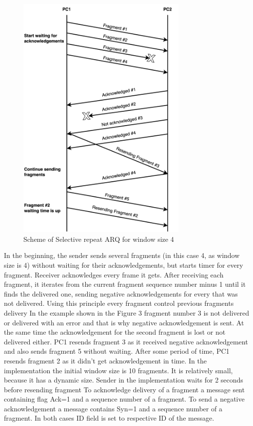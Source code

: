 \documentclass{article}
\begin{document}
\begin{figure}[!h]
    \centering
    \includegraphics[width=0.75\textwidth]{images/arq.png}
    \caption{Scheme of Selective repeat ARQ for window size 4}
    \label{fig:mesh1}
\end{figure}

In the beginning, the sender sends several fragments (in this case 4, as window size is 4) without waiting for their acknowledgements, but starts timer for every fragment.  Receiver acknowledges every frame it gets. After receiving each fragment, it iterates from the current fragment sequence number minus 1 until it finds the delivered one, sending negative acknowledgements for every that was not delivered. Using this principle every fragment control previous fragments delivery    In the example shown in the Figure 3 fragment number 3 is not delivered or delivered with an error and that is why negative acknowledgement is sent. At the same time the acknowledgement for the second fragment is lost or not delivered  either.  PC1 resends fragment 3 as it received negative acknowledgement and also sends fragment 5  without waiting. After some period of time, PC1 resends fragment 2 as it didn't get acknowledgement in time.\newline
In the implementation the initial window size is 10 fragments. It is relatively small, because it has a dynamic size. Sender in the implementation waits for 2 seconds before resending fragment \newline
To acknowledge delivery of a fragment a message sent containing flag Ack=1 and a sequence number of a fragment. To send a negative acknowledgement a message contains Syn=1 and a sequence number of a fragment. In both cases ID field is set to respective ID of the message.
\end{document}
